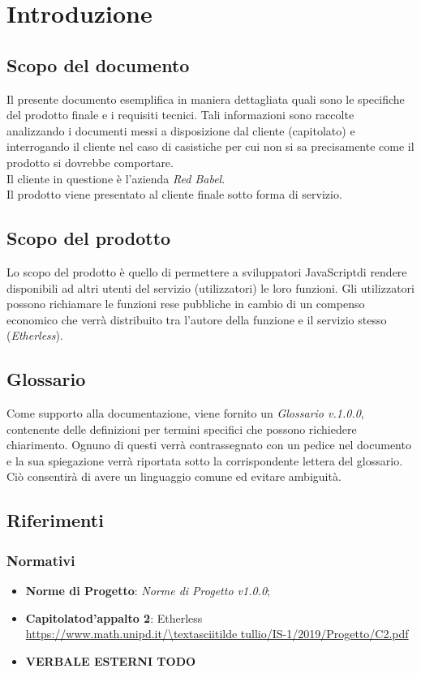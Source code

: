 \section{Introduzione}

\subsection{Scopo del documento}
Il presente documento esemplifica in maniera dettagliata quali sono le specifiche del prodotto finale e i requisiti tecnici. Tali informazioni sono raccolte analizzando i documenti messi a disposizione dal cliente (capitolato\glo) e interrogando il cliente nel caso di casistiche per cui non si sa precisamente come il prodotto si dovrebbe comportare.\\
Il cliente in questione è l'azienda \textit{Red Babel}.
\\Il prodotto viene presentato al cliente finale sotto forma di servizio.

\subsection{Scopo del prodotto}
Lo scopo del prodotto è quello di permettere a sviluppatori JavaScript\glo di rendere disponibili ad altri utenti del servizio (utilizzatori) le loro funzioni. Gli utilizzatori possono richiamare le funzioni rese pubbliche in cambio di un compenso economico che verrà distribuito tra l'autore della funzione e il servizio stesso (\textit{Etherless}).
	
\subsection{Glossario}
Come supporto alla documentazione, viene fornito un \textit{Glossario v.1.0.0}, contenente delle definizioni per termini specifici che possono richiedere chiarimento. Ognuno di questi verrà contrassegnato con un pedice \glo nel documento e la sua spiegazione verrà riportata sotto la corrispondente lettera del glossario. Ciò consentirà di avere un linguaggio comune ed evitare ambiguità. 
	
\subsection{Riferimenti}
\subsubsection{Normativi}
	\begin{itemize}
		\item \textbf{Norme di Progetto}: \textit{Norme di Progetto v1.0.0};
		\item \textbf{Capitolato\glo d'appalto 2}: Etherless\\ 
			\url{https://www.math.unipd.it/\textasciitilde tullio/IS-1/2019/Progetto/C2.pdf}
		\item \textbf{VERBALE ESTERNI TODO}
	\end{itemize}
